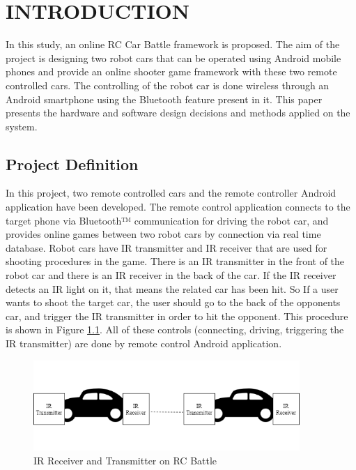 \chapter{INTRODUCTION}
In this study, an online RC Car Battle framework is proposed. The aim of the project is designing two robot cars that can be operated using Android mobile phones and provide an online shooter game framework with these two remote controlled cars. The controlling of the robot car is done wireless through an Android smartphone using the Bluetooth\texttrademark\; feature present in it. This paper presents the hardware and software design decisions and methods applied on the system. \\

\section{Project Definition}

In this project, two remote controlled cars and the remote controller Android application have been developed. The remote control application connects to the target phone via Bluetooth™ communication for driving the robot car, and provides online games between two robot cars by connection via real time database. Robot cars have IR transmitter and IR receiver that are used for shooting procedures in the game. There is an IR transmitter in the front of the robot car and there is an IR receiver in the back of the car. If the IR receiver detects an IR light on it, that means the related car has been hit. So If a user wants to shoot the target car, the user should go to the back of the opponents car, and trigger the IR transmitter in order to hit the opponent. This procedure is shown in Figure \ref{fig:frog}. All of these controls (connecting, driving, triggering the IR transmitter) are done by remote control Android application.

\begin{figure}[!htbp]
    \centering
    \includegraphics[width=0.9\textwidth]{Imgs/ir_diagram.png}
    \caption{\label{fig:frog}IR Receiver and Transmitter on RC Battle}
\end{figure}

